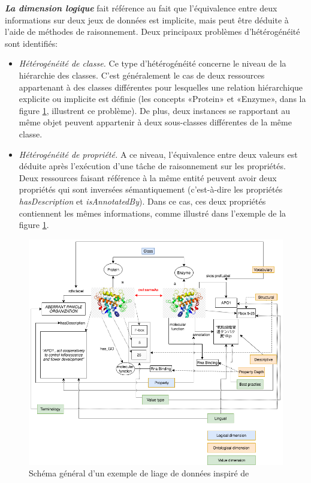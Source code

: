 \textbf{\textit{La dimension logique}} fait référence au fait que l'équivalence entre deux informations sur deux jeux de données est implicite, mais peut être déduite à l'aide de méthodes de raisonnement. Deux principaux problèmes d’hétérogénéité sont identifiés:\\
\begin{itemize}
\item \textit{Hétérogénéité de classe.} Ce type d'hétérogénéité concerne le niveau de la hiérarchie des classes. C'est généralement le cas de deux ressources appartenant à des classes différentes pour lesquelles une relation hiérarchique explicite ou implicite est définie (les concepts «Protein» et «Enzyme», dans la figure  \ref{exempleL}, illustrent ce problème). De plus, deux instances se rapportant au même objet peuvent appartenir à deux sous-classes différentes de la même classe.\\
\item \textit{Hétérogénéité de propriété.} A ce niveau, l'équivalence entre deux valeurs est déduite après l'exécution d'une tâche de raisonnement sur les propriétés. Deux ressources faisant référence à la même entité peuvent avoir deux propriétés qui sont inversées sémantiquement (c’est-à-dire les propriétés \textit{hasDescription} et \textit{isAnnotatedBy}). Dans ce cas, ces deux propriétés contiennent les mêmes informations, comme illustré dans l'exemple de la figure \ref{exempleL}.\\
\end{itemize}

\begin{figure}[!ht]
\begin{center}
	\includegraphics[width=1\textwidth]{Figures/exempleLiage.png}
\end{center}
\label{exempleL}
\caption[Schéma général d'un exemple de liage de données]{ Schéma général d'un exemple de liage de données inspiré de ~\cite{achichi2018} }
\end{figure}


